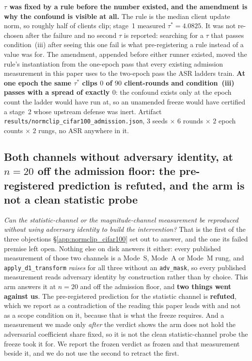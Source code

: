 \documentclass{article}
\begin{document}
\textbf{$\tau$ was fixed by a rule before the number existed, and the amendment is why the confound is visible at all.} The rule is the median client update norm, so roughly half of clients clip; stage~1 measured $\tau^\ast{=}4.0825$. It was not re-chosen after the failure and no second $\tau$ is reported: searching for a $\tau$ that passes condition~(iii) after seeing this one fail is what pre-registering a rule instead of a value was for. The amendment, appended before either runner existed, moved the rule's instantiation from the one-epoch pass that every existing admission measurement in this paper uses to the two-epoch pass the ASR ladders train. \textbf{At one epoch the same $\tau^\ast$ clips $0$ of $90$ client-rounds and condition~(iii) passes with a spread of exactly $0$}: the confound exists only at the epoch count the ladder would have run at, so an unamended freeze would have certified a stage~2 whose upstream defense was inert. Artifact \texttt{results/normclip\_\allowbreak cifar100\_\allowbreak admission.json}, $3$ seeds $\times$ $6$ rounds $\times$ $2$ epoch counts $\times$ $2$ rungs, no ASR anywhere in it.

\subsection{Both channels without adversary identity, at $n{=}20$ off the admission floor: the pre-registered prediction is refuted, and the arm is not a clean statistic probe}
\label{app:oracle_free}

\noindent \emph{Can the statistic-channel or the magnitude-channel measurement be reproduced without using adversary identity to build the intervention?} That is the first of the three objections §\ref{app:normclip_cifar100} set out to answer, and the one its failed premise left open. Nothing else on disk answers it either: every published measurement of those two channels is a Mode~S, Mode~A or Mode~M rung, and \texttt{apply\_d1\_transform} \emph{raises} for all three without an \texttt{adv\_mask}, so every published measurement reads adversary identity by construction rather than by choice. This arm answers it at $n{=}20$ and off the admission floor, and \textbf{two things went against us}. The pre-registered prediction for the statistic channel is \textbf{refuted}, which we report as a contradiction of the reading this paper leads with and not as a scope condition on it, because that is what the freeze requires. And a measurement we made only \emph{after} the verdict shows the arm does not hold the adversarial coefficient share fixed, so it is not the clean statistic-channel probe the freeze took it for. We report the frozen verdict as frozen and that measurement beside it, and we do not use the second to retract the first.
\end{document}
